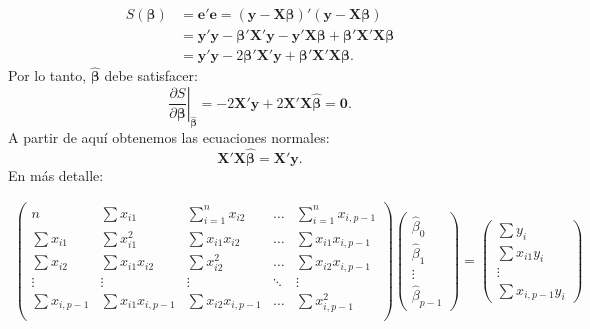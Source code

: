 \documentclass[
]{article}
\begin{document}
\begin{equation}
\begin{split}
S(\boldsymbol \beta) &= \boldsymbol e'\boldsymbol e= (\boldsymbol y- \boldsymbol X\boldsymbol \beta)'(\boldsymbol y- \boldsymbol X\boldsymbol \beta) \\
&= \boldsymbol y'\boldsymbol y- \boldsymbol \beta'\boldsymbol X'\boldsymbol y- \boldsymbol y'\boldsymbol X\boldsymbol \beta+ \boldsymbol \beta'\boldsymbol X'\boldsymbol X\boldsymbol \beta\\
&= \boldsymbol y'\boldsymbol y- 2\boldsymbol \beta'\boldsymbol X'\boldsymbol y+ \boldsymbol \beta'\boldsymbol X'\boldsymbol X\boldsymbol \beta.
\end{split}
\nonumber
\end{equation}
Por lo tanto, \(\widehat{\boldsymbol \beta}\) debe satisfacer:
\[
\left. \frac{\partial S}{\partial \boldsymbol \beta} \right|_{\widehat{\boldsymbol \beta}} = - 2\boldsymbol X'\boldsymbol y+ 2\boldsymbol X'\boldsymbol X\widehat{\boldsymbol \beta}= \boldsymbol 0.
\]
A partir de aquí obtenemos las ecuaciones normales:
\[
\boldsymbol X'\boldsymbol X\widehat{\boldsymbol \beta}= \boldsymbol X'\boldsymbol y.
\]
En más detalle:

\begin{gather}
\begin{pmatrix}
n & \sum x_{i1} & \sum_{i=1}^{n}x_{i2} & \ldots & \sum_{i=1}^{n}x_{i,p-1} \\
\sum x_{i1} & \sum x_{i1}^2 & \sum x_{i1}x_{i2} & \ldots & \sum x_{i1}x_{i,p-1} \\
\sum x_{i2} & \sum x_{i1}x_{i2} & \sum x_{i2}^2 & \ldots & \sum x_{i2}x_{i,p-1} \\
\vdots & \vdots & \vdots & \ddots & \vdots \\
\sum x_{i,p-1} & \sum x_{i1}x_{i,p-1} & \sum x_{i2}x_{i,p-1} & \ldots & \sum x_{i,p-1}^{2} \\
\end{pmatrix} \begin{pmatrix}
\widehat{\beta}_{0} \\ \widehat{\beta}_{1} \\ \vdots \\ \widehat{\beta}_{p-1} \end{pmatrix} = \begin{pmatrix}
\sum y_{i} \\ \sum x_{i1}y_{i} \\ \vdots \\ \sum x_{i,p-1}y_{i}
\end{pmatrix}
\nonumber
\end{gather}
\end{document}
